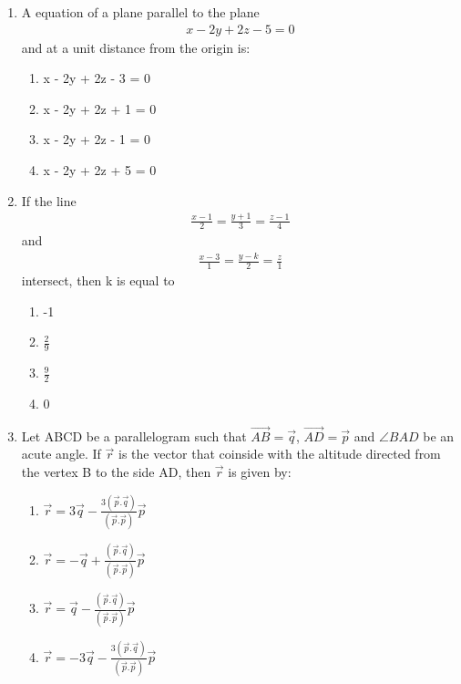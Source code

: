\begin{enumerate}[label=\arabic*.,ref=\thesubsection.\theenumi]
\item A equation of a plane parallel to the plane 
\begin{align}
x - 2y + 2z - 5 = 0
\end{align}
and at a unit distance from the origin is:
\begin{enumerate}
\item x - 2y + 2z - 3 = 0
\item x - 2y + 2z + 1 = 0
\item x - 2y + 2z - 1 = 0
\item x - 2y + 2z + 5 = 0
\end{enumerate}

\item If the line 
\begin{align*}
\frac{x-1}{2} = \frac{y+1}{3} = \frac{z-1}{4}
\end{align*}
and 
\begin{align*}
\frac{x-3}{1} = \frac{y-k}{2} = \frac{z}{1}
\end{align*}
intersect, then k is equal to
\begin{enumerate}
\item -1
\item $\frac{2}{9}$
\item $\frac{9}{2}$
\item 0
\end{enumerate}

\item Let ABCD be a parallelogram such that $\overrightarrow{AB}=\overrightarrow{q}$, $\overrightarrow{AD}=\overrightarrow{p}$ and $\angle BAD$ be an acute angle. If $\overrightarrow{r}$ is the vector that coinside with the altitude directed from the vertex B to the side AD, then $\overrightarrow{r}$ is given by:
\begin{enumerate}
\item $\overrightarrow{r}=3\overrightarrow{q}-\frac{3(\overrightarrow{p}.\overrightarrow{q})}{(\overrightarrow{p}.\overrightarrow{p})}\overrightarrow{p}$
\item $\overrightarrow{r}=-\overrightarrow{q}+\frac{(\overrightarrow{p}.\overrightarrow{q})}{(\overrightarrow{p}.\overrightarrow{p})}\overrightarrow{p}$
\item $\overrightarrow{r}=\overrightarrow{q}-\frac{(\overrightarrow{p}.\overrightarrow{q})}{(\overrightarrow{p}.\overrightarrow{p})}\overrightarrow{p}$
\item $\overrightarrow{r}=-3\overrightarrow{q}-\frac{3(\overrightarrow{p}.\overrightarrow{q})}{(\overrightarrow{p}.\overrightarrow{p})}\overrightarrow{p}$
\end{enumerate}


\end{enumerate}
